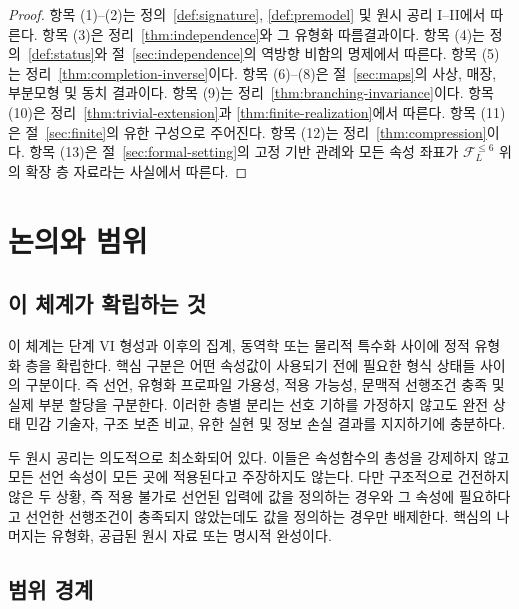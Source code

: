 \documentclass[11pt]{article}
\newcommand{\FVI}{\mathcal F_{L}^{\le 6}}
\theoremstyle{definition}
\theoremstyle{remark}
\begin{document}
\begin{proof}
항목 (1)--(2)는 정의~\ref{def:signature}, \ref{def:premodel} 및 원시 공리 I--II에서 따른다.
항목 (3)은 정리~\ref{thm:independence}와 그 유형화 따름결과이다.
항목 (4)는 정의~\ref{def:status}와 절~\ref{sec:independence}의 역방향 비함의 명제에서 따른다.
항목 (5)는 정리~\ref{thm:completion-inverse}이다.
항목 (6)--(8)은 절~\ref{sec:maps}의 사상, 매장, 부분모형 및 동치 결과이다.
항목 (9)는 정리~\ref{thm:branching-invariance}이다.
항목 (10)은 정리~\ref{thm:trivial-extension}과 \ref{thm:finite-realization}에서 따른다.
항목 (11)은 절~\ref{sec:finite}의 유한 구성으로 주어진다.
항목 (12)는 정리~\ref{thm:compression}이다.
항목 (13)은 절~\ref{sec:formal-setting}의 고정 기반 관례와 모든 속성 좌표가 \(\FVI\) 위의 확장 층 자료라는 사실에서 따른다.
\end{proof}

\section{논의와 범위}
\label{sec:discussion}

\subsection{이 체계가 확립하는 것}

이 체계는 단계 VI 형성과 이후의 집계, 동역학 또는 물리적 특수화 사이에 정적 유형화 층을 확립한다.
핵심 구분은 어떤 속성값이 사용되기 전에 필요한 형식 상태들 사이의 구분이다. 즉 선언, 유형화 프로파일 가용성, 적용 가능성, 문맥적 선행조건 충족 및 실제 부분 할당을 구분한다.
이러한 층별 분리는 선호 기하를 가정하지 않고도 완전 상태 민감 기술자, 구조 보존 비교, 유한 실현 및 정보 손실 결과를 지지하기에 충분하다.

두 원시 공리는 의도적으로 최소화되어 있다.
이들은 속성함수의 총성을 강제하지 않고 모든 선언 속성이 모든 곳에 적용된다고 주장하지도 않는다.
다만 구조적으로 건전하지 않은 두 상황, 즉 적용 불가로 선언된 입력에 값을 정의하는 경우와 그 속성에 필요하다고 선언한 선행조건이 충족되지 않았는데도 값을 정의하는 경우만 배제한다.
핵심의 나머지는 유형화, 공급된 원시 자료 또는 명시적 완성이다.

\subsection{범위 경계}
\end{document}
